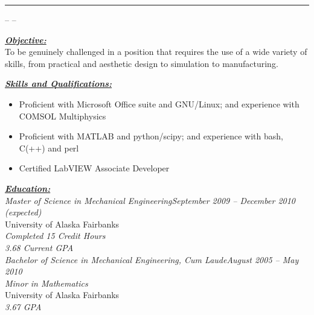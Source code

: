 \documentclass[10pt, letterpaper]{article}
\author{Joshua Holbrook}
\renewcommand{\section}[1]{\bigskip\Large\textbf{\underline{\textit{#1}}}\normalsize\\} %
\begin{document}
\textbf{\Huge \theauthor }\hrule
\smallskip\small \theaddress -- \phonenumber -- \emailaddress \normalsize

\section{Objective:}

\small To be genuinely challenged in a position that requires the use of a wide variety of skills, from practical and aesthetic design to simulation to manufacturing.\normalsize


\section{Skills and Qualifications:}
\small\begin{itemize}
\item Proficient with Microsoft Office suite and GNU/Linux; and experience with COMSOL Multiphysics
\item Proficient with MATLAB and python/scipy; and experience with bash, C(++) and perl
\item Certified LabVIEW Associate Developer
\end{itemize}\normalsize

\section{Education:}

\large\textit{Master of Science in Mechanical Engineering\hfill September 2009 -- December 2010 (expected)}\normalsize \\
University of Alaska Fairbanks\\
\emph{Completed 15 Credit Hours}\\
\emph{3.68 Current GPA}\\

\large\textit{Bachelor of Science in Mechanical Engineering, Cum Laude\hfill August 2005 -- May 2010}\normalsize \\
\textit{Minor in Mathematics}\\
University of Alaska Fairbanks\\
\textit{3.67 GPA} %
\end{document}
